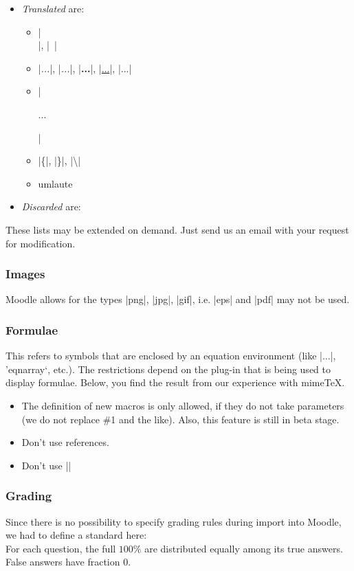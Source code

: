\documentclass[a4paper,10pt]{ltxdoc}
\begin{document}
\begin{itemize}
    \item \emph{Translated} are:
        \begin{itemize}
            \item |\\|, |~|
            \item |\emph{...}|, |\textit{...}|, |\textbf{...}|,
            |\underline{...}|, |\(...\)|
            \item |\begin{center}...\end{center}|
            \item |\{|, |\}|, |\textbackslash|
            \item umlaute
        \end{itemize}
     \item \emph{Discarded} are:
        \begin{itemize}
            \item |\vskip|, |\,|
        \end{itemize}
\end{itemize}

These lists may be extended on demand. Just send us an email with your request
for modification.

\subsubsection{Images}
Moodle allows for the types |png|, |jpg|, |gif|, i.e. |eps| and |pdf| may not
be used.

\subsubsection{Formulae}
This refers to symbols that are enclosed by an equation environment  (like
|$\ldots$|, 'eqnarray`, etc.). The restrictions depend on the plug-in that is
being used to display formulae. Below, you find the result from our experience
with mimeTeX.

\begin{itemize}
  \item The definition of new macros is only allowed, if they do not take
  parameters (we do not replace \#1 and the like).  Also, this feature is still
  in beta stage.
  \item Don't use references.
  \item Don't use |\makebox|
\end{itemize}

\subsubsection{Grading}
Since there is no possibility to specify grading rules during import into
Moodle, we had to define a standard here:\\
For each question, the full $100\%$ are distributed equally among its true
answers. False answers have fraction $0$.
\end{document}

